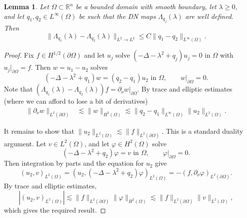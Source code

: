 \documentclass[a4paper, 11pt, twoside, notitlepage]{amsart}
\newtheorem{lemma}[theorem]{Lemma}
\theoremstyle{definition}
\theoremstyle{remark}
\newcommand{\R}{{\mathbb R}}
\newcommand {\p} {\partial}
\newcommand{\norm}[1]{\lVert #1 \rVert}
\begin{document}
\begin{lemma} \label{lemma_dnmap_difference_ltwo}
Let $\Omega \subset \R^n$ be a bounded domain with smooth boundary, let $\lambda \geq 0$, and let $q_1, q_2 \in L^{\infty}(\Omega)$ be such that the DN maps $\Lambda_{q_j}(\lambda)$ are well defined. Then 
\[
\norm{\Lambda_{q_1}(\lambda) - \Lambda_{q_2}(\lambda)}_{L^2 \to L^2} \leq C \norm{q_1-q_2}_{L^{\infty}(\Omega)}.
\]
\end{lemma}
\begin{proof}
Fix $f \in H^{1/2}(\p \Omega)$ and let $u_j$ solve $(-\Delta-\lambda^2+q_j) u_j = 0$ in $\Omega$ with $u_j|_{\p \Omega} = f$. Then $w = u_1-u_2$ solves 
\[
(-\Delta-\lambda^2+q_1)w = (q_2-q_1)u_2 \text{ in $\Omega$}, \qquad w|_{\p \Omega} = 0.
\]
Note that $(\Lambda_{q_1}(\lambda) - \Lambda_{q_2}(\lambda)) f = \p_{\nu} w|_{\p \Omega}$. By trace and elliptic estimates (where we can afford to lose a bit of derivatives) 
\begin{align*}
\norm{\p_{\nu} w}_{L^2(\p \Omega)} &\lesssim \norm{w}_{H^2(\Omega)} \lesssim \norm{q_2-q_1}_{L^{\infty}(\Omega)} \norm{u_2}_{L^2(\Omega)}.
\end{align*}

It remains to show that $\norm{u_2}_{L^2(\Omega)} \lesssim \norm{f}_{L^2(\p \Omega)}$. This is a standard duality argument. Let $v \in L^2(\Omega)$, and let $\varphi \in H^2(\Omega)$ solve 
\[
(-\Delta-\lambda^2+q_2)\varphi = v \text{ in $\Omega$}, \qquad \varphi|_{\p \Omega} = 0.
\]
Then integration by parts and the equation for $u_2$ give 
\[
(u_2, v)_{L^2(\Omega)} = (u_2, (-\Delta-\lambda^2+q_2)\varphi)_{L^2(\Omega)} = -(f, \p_{\nu} \varphi)_{L^2(\p \Omega)}.
\]
By trace and elliptic estimates, 
\[
|(u_2, v)_{L^2(\Omega)}| \lesssim \norm{f}_{L^2(\p \Omega)} \norm{\varphi}_{H^2(\Omega)} \lesssim \norm{f}_{L^2(\p \Omega)} \norm{v}_{L^2(\Omega)},
\]
which gives the required result.
\end{proof}




\printbibliography 
\end{document}
